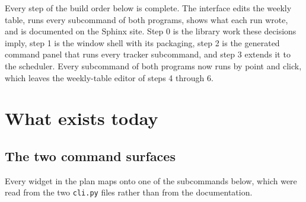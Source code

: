 \documentclass[11pt]{article}
\begin{document}
Every step of the build order below is complete. The interface edits the weekly
table, runs every subcommand of both programs, shows what each run wrote, and is
documented on the Sphinx site. Step 0 is the library
work these decisions imply, step 1 is the window shell with its packaging, step
2 is the generated command panel that runs every tracker subcommand, and step 3
extends it to the scheduler. Every subcommand of both programs now runs by point
and click, which leaves the weekly-table editor of steps 4 through 6.
\section{What exists today}
\label{sec:org40427b2}

\subsection{The two command surfaces}
\label{sec:orgf1729a4}

Every widget in the plan maps onto one of the subcommands below, which were
read from the two \texttt{cli.py} files rather than from the documentation.
\end{document}
